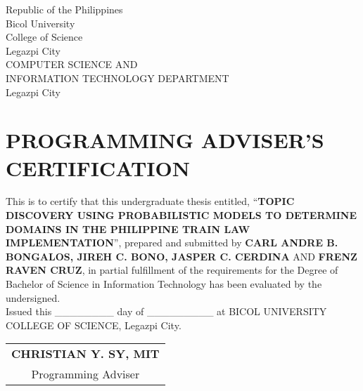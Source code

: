 \begin{flushright}
	
\end{flushright}%
%

\begin{center}
	{	Republic of the Philippines \\
		Bicol University \\
		College of Science \\
		Legazpi City \\
		COMPUTER SCIENCE AND\\
		INFORMATION TECHNOLOGY DEPARTMENT\\
		Legazpi City\\[0.1ex]}
\end{center} 

\section{\normalsize{PROGRAMMING ADVISER'S CERTIFICATION}}

			
	This is to certify that this undergraduate thesis entitled, “\textbf{TOPIC DISCOVERY USING PROBABILISTIC MODELS TO DETERMINE DOMAINS IN THE PHILIPPINE TRAIN LAW IMPLEMENTATION}”, prepared and submitted by \textbf{CARL ANDRE B. BONGALOS, JIREH C. BONO, JASPER C. CERDINA} AND \textbf{FRENZ RAVEN CRUZ}, in partial fulfillment of the requirements for the Degree of Bachelor of Science in Information Technology has been evaluated by the undersigned.\\[10pt]
		 
		 
		Issued this \_\_\_\_\_\_\_\_ day of \_\_\_\_\_\_\_\_\_ at BICOL UNIVERSITY COLLEGE OF SCIENCE, Legazpi City.\\[50pt]

	
\begin{flushright}
    \begin{tabular}{c}
    	\textbf{CHRISTIAN Y. SY, MIT}\\
        Programming Adviser
    \end{tabular}
\end{flushright}

%